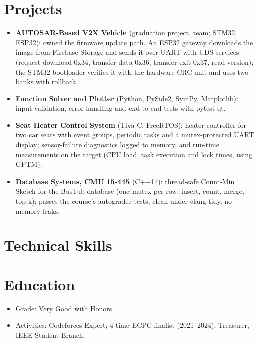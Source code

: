 \documentclass[10pt]{article}
\begin{document}
\section*{Projects}
\begin{itemize}
  \item \textbf{AUTOSAR-Based V2X Vehicle} (graduation project, team; STM32, ESP32): owned the firmware update path. An ESP32 gateway downloads the image from Firebase Storage and sends it over UART with UDS services (request download 0x34, transfer data 0x36, transfer exit 0x37, read version); the STM32 bootloader verifies it with the hardware CRC unit and uses two banks with rollback. 
  \item \textbf{Function Solver and Plotter} (Python, PySide2, SymPy, Matplotlib): input validation, error handling and end-to-end tests with pytest-qt. 
  \item \textbf{Seat Heater Control System} (Tiva C, FreeRTOS): heater controller for two car seats with event groups, periodic tasks and a mutex-protected UART display; sensor-failure diagnostics logged to memory, and run-time measurements on the target (CPU load, task execution and lock times, using GPTM). 
  \item \textbf{Database Systems, CMU 15-445} (C++17): thread-safe Count-Min Sketch for the BusTub database (one mutex per row; insert, count, merge, top-k); passes the course's autograder tests, clean under clang-tidy, no memory leaks. 
\end{itemize}

\section*{Technical Skills}

\section*{Education}
\begin{itemize}
  \item Grade: Very Good with Honors.
  \item Activities: Codeforces Expert; 4-time ECPC finalist (2021--2024); Treasurer, IEEE Student Branch.
\end{itemize}
\end{document}
